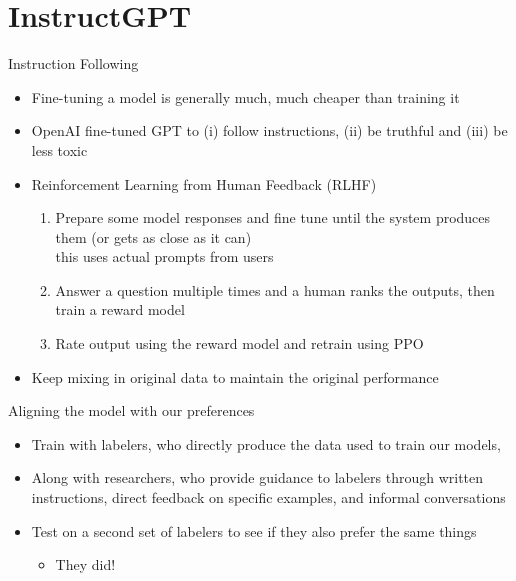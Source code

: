 \section{InstructGPT}



\begin{frame}{Instruction Following}

\begin{itemize}
\item Fine-tuning a model is generally much, much cheaper than training it
\item OpenAI fine-tuned GPT to (i) follow instructions, (ii) be truthful and (iii) be less toxic
\item  Reinforcement Learning from  Human Feedback (RLHF)
  \begin{enumerate}
  \item Prepare some model responses and fine tune until the system
    produces them (or gets as close as it can)
    \\ this uses actual prompts from users
  \item Answer a question multiple times and a human ranks the
    outputs, then train a reward model 
  \item Rate output using the reward model and retrain using PPO
  \end{enumerate}
\item  Keep mixing in original data to maintain the original performance
    
\end{itemize}

\end{frame}

\begin{frame}{Aligning the model with our preferences}
\begin{itemize}
\item Train with labelers, who directly produce the data used to train our models,
\item Along with  researchers, who provide guidance to labelers through written instructions, direct feedback on specific examples, and informal conversations
\item Test on a second set of labelers to see if they also prefer the same things
  \begin{itemize}
  \item They did!
  \end{itemize}

\end{itemize}

\end{frame}

